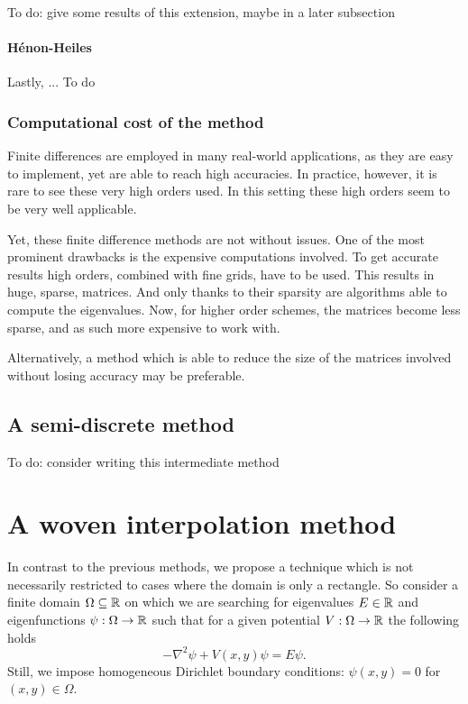 {\color{red}To do: give some results of this extension, maybe in a later subsection}

\paragraph{Hénon-Heiles} Lastly, ... {\color{red}To do}


\subsubsection{Computational cost of the method}

Finite differences are employed in many real-world applications, as they are easy to implement, yet are able to reach high accuracies. In practice, however, it is rare to see these very high orders used. In this setting these high orders seem to be very well applicable.

Yet, these finite difference methods are not without issues. One of the most prominent drawbacks is the expensive computations involved. To get accurate results high orders, combined with fine grids, have to be used. This results in huge, sparse, matrices. And only thanks to their sparsity are algorithms able to compute the eigenvalues. Now, for higher order schemes, the matrices become less sparse, and as such more expensive to work with.

Alternatively, a method which is able to reduce the size of the matrices involved without losing accuracy may be preferable.

\subsection{A semi-discrete method}\label{sec:c4_semi_discrete}

{\color{red} To do: consider writing this intermediate method}

\section{A woven interpolation method}

In contrast to the previous methods, we propose a technique which is not necessarily restricted to cases where the domain is only a rectangle. So consider a finite domain $\Omega \subseteq \mathbb{R}$ on which we are searching for eigenvalues $E \in \mathbb{R}$ and eigenfunctions $\psi: \Omega \to \mathbb{R}$ such that for a given potential $V : \Omega \to \mathbb{R}$ the following holds
\begin{equation}\label{equ:c4_schrodinger_equation_new_method}
    -\nabla^2 \psi + V(x, y) \psi = E \psi\text{.}
\end{equation}
Still, we impose homogeneous Dirichlet boundary conditions: $\psi(x, y) = 0$ for $(x, y) \in \Omega$.

